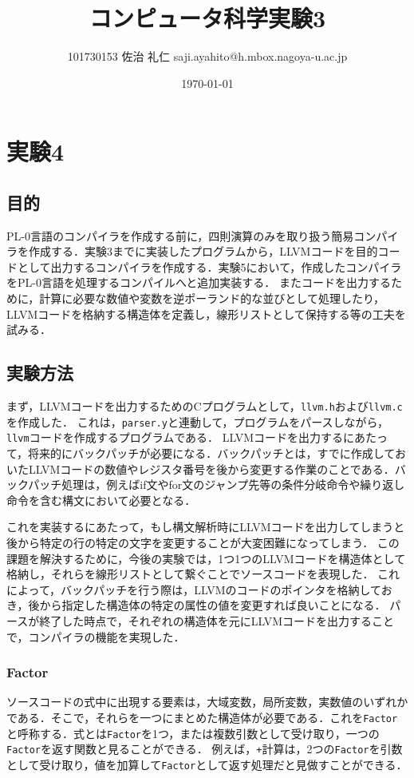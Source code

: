 \documentclass[uplatex]{jsarticle}
\title{コンピュータ科学実験3}
\author{101730153 佐治 礼仁 saji.ayahito@h.mbox.nagoya-u.ac.jp}
\date{\today}
\begin{document}
\maketitle
\newpage
\tableofcontents
\newpage
\section{実験4}
\subsection{目的}
PL-0言語のコンパイラを作成する前に，四則演算のみを取り扱う簡易コンパイラを作成する．実験3までに実装したプログラムから，LLVMコードを目的コードとして出力するコンパイラを作成する．実験5において，作成したコンパイラをPL-0言語を処理するコンパイルへと追加実装する．
またコードを出力するために，計算に必要な数値や変数を逆ポーランド的な並びとして処理したり，LLVMコードを格納する構造体を定義し，線形リストとして保持する等の工夫を試みる．
\subsection{実験方法}
まず，LLVMコードを出力するためのCプログラムとして，\verb#llvm.h#および\verb#llvm.c#を作成した．
これは，\verb#parser.y#と連動して，プログラムをパースしながら，\verb#llvm#コードを作成するプログラムである．
LLVMコードを出力するにあたって，将来的にバックパッチが必要になる．バックパッチとは，すでに作成しておいたLLVMコードの数値やレジスタ番号を後から変更する作業のことである．バックパッチ処理は，例えばif文やfor文のジャンプ先等の条件分岐命令や繰り返し命令を含む構文において必要となる．

これを実装するにあたって，もし構文解析時にLLVMコードを出力してしまうと後から特定の行の特定の文字を変更することが大変困難になってしまう．
この課題を解決するために，今後の実験では，1つ1つのLLVMコードを構造体として格納し，それらを線形リストとして繋ぐことでソースコードを表現した．
これによって，バックパッチを行う際は，LLVMのコードのポインタを格納しておき，後から指定した構造体の特定の属性の値を変更すれば良いことになる．
パースが終了した時点で，それぞれの構造体を元にLLVMコードを出力することで，コンパイラの機能を実現した．

\subsubsection{Factor}
ソースコードの式中に出現する要素は，大域変数，局所変数，実数値のいずれかである．そこで，それらを一つにまとめた構造体が必要である．これを\verb#Factor#と呼称する．式とは\verb#Factor#を1つ，または複数引数として受け取り，一つの\verb#Factor#を返す関数と見ることができる．
例えば，\verb#+#計算は，2つの\verb#Factor#を引数として受け取り，値を加算して\verb#Factor#として返す処理だと見做すことができる．
\end{document}
